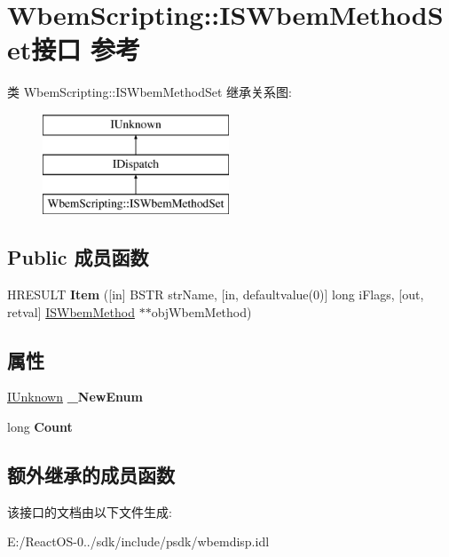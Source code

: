 \hypertarget{interface_wbem_scripting_1_1_i_s_wbem_method_set}{}\section{Wbem\+Scripting\+:\+:I\+S\+Wbem\+Method\+Set接口 参考}
\label{interface_wbem_scripting_1_1_i_s_wbem_method_set}
类 Wbem\+Scripting\+:\+:I\+S\+Wbem\+Method\+Set 继承关系图\+:\begin{figure}[H]
\begin{center}
\leavevmode
\includegraphics[height=3.000000cm]{interface_wbem_scripting_1_1_i_s_wbem_method_set}
\end{center}
\end{figure}
\subsection*{Public 成员函数}
\begin{DoxyCompactItemize}
\item 
\mbox{\label{interface_wbem_scripting_1_1_i_s_wbem_method_set_a2a1c005e91a7da3103161a9b3ebbe385}} 
H\+R\+E\+S\+U\+LT {\bfseries Item} (\mbox{[}in\mbox{]} B\+S\+TR str\+Name, \mbox{[}in, defaultvalue(0)\mbox{]} long i\+Flags, \mbox{[}out, retval\mbox{]} \hyperlink{interface_wbem_scripting_1_1_i_s_wbem_method}{I\+S\+Wbem\+Method} $\ast$$\ast$obj\+Wbem\+Method)
\end{DoxyCompactItemize}
\subsection*{属性}
\begin{DoxyCompactItemize}
\item 
\mbox{\label{interface_wbem_scripting_1_1_i_s_wbem_method_set_ac70850a911abdff5a3151d036fd43851}} 
\hyperlink{interface_i_unknown}{I\+Unknown} {\bfseries \+\_\+\+New\+Enum}
\item 
\mbox{\label{interface_wbem_scripting_1_1_i_s_wbem_method_set_ab1cd93d9b57cdd9b0cc27e614cf1b34b}} 
long {\bfseries Count}
\end{DoxyCompactItemize}
\subsection*{额外继承的成员函数}


该接口的文档由以下文件生成\+:\begin{DoxyCompactItemize}
\item 
E\+:/\+React\+O\+S-\/0../sdk/include/psdk/wbemdisp.\+idl\end{DoxyCompactItemize}
